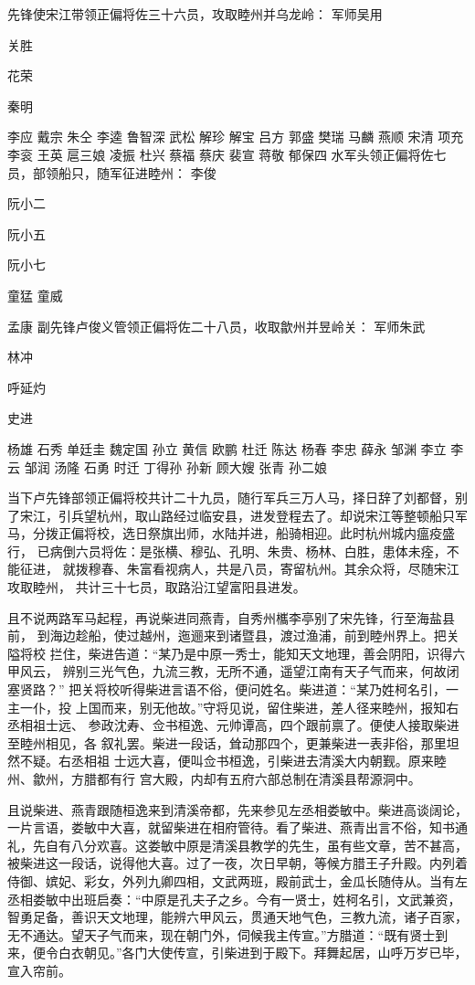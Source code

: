 先锋使宋江带领正偏将佐三十六员，攻取睦州并乌龙岭：
军师吴用

关胜

花荣

秦明

李应
戴宗
朱仝
李逵
鲁智深
武松
解珍
解宝
吕方
郭盛
樊瑞
马麟
燕顺
宋清
项充
李衮
王英
扈三娘
凌振
杜兴
蔡福
蔡庆
裴宣
蒋敬
郁保四
水军头领正偏将佐七员，部领船只，随军征进睦州：
李俊

阮小二

阮小五

阮小七

童猛
童威

孟康
副先锋卢俊义管领正偏将佐二十八员，收取歙州并昱岭关：
军师朱武

林冲

呼延灼

史进

杨雄
石秀
单廷圭
魏定国
孙立
黄信
欧鹏
杜迁
陈达
杨春
李忠
薛永
邹渊
李立
李云
邹润
汤隆
石勇
时迁
丁得孙
孙新
顾大嫂
张青
孙二娘

当下卢先锋部领正偏将校共计二十九员，随行军兵三万人马，择日辞了刘都督，别
了宋江，引兵望杭州，取山路经过临安县，进发登程去了。却说宋江等整顿船只军
马，分拨正偏将校，选日祭旗出师，水陆并进，船骑相迎。此时杭州城内瘟疫盛行，
已病倒六员将佐：是张横、穆弘、孔明、朱贵、杨林、白胜，患体未痊，不能征进，
就拨穆春、朱富看视病人，共是八员，寄留杭州。其余众将，尽随宋江攻取睦州，
共计三十七员，取路沿江望富阳县进发。

且不说两路军马起程，再说柴进同燕青，自秀州欈李亭别了宋先锋，行至海盐县前，
到海边趁船，使过越州，迤逦来到诸暨县，渡过渔浦，前到睦州界上。把关隘将校
拦住，柴进告道：“某乃是中原一秀士，能知天文地理，善会阴阳，识得六甲风云，
辨别三光气色，九流三教，无所不通，遥望江南有天子气而来，何故闭塞贤路？”
把关将校听得柴进言语不俗，便问姓名。柴进道：“某乃姓柯名引，一主一仆，投
上国而来，别无他故。”守将见说，留住柴进，差人径来睦州，报知右丞相祖士远、
参政沈寿、佥书桓逸、元帅谭高，四个跟前禀了。便使人接取柴进至睦州相见，各
叙礼罢。柴进一段话，耸动那四个，更兼柴进一表非俗，那里坦然不疑。右丞相祖
士远大喜，便叫佥书桓逸，引柴进去清溪大内朝觐。原来睦州、歙州，方腊都有行
宫大殿，内却有五府六部总制在清溪县帮源洞中。

且说柴进、燕青跟随桓逸来到清溪帝都，先来参见左丞相娄敏中。柴进高谈阔论，
一片言语，娄敏中大喜，就留柴进在相府管待。看了柴进、燕青出言不俗，知书通
礼，先自有八分欢喜。这娄敏中原是清溪县教学的先生，虽有些文章，苦不甚高，
被柴进这一段话，说得他大喜。过了一夜，次日早朝，等候方腊王子升殿。内列着
侍御、嫔妃、彩女，外列九卿四相，文武两班，殿前武士，金瓜长随侍从。当有左
丞相娄敏中出班启奏：“中原是孔夫子之乡。今有一贤士，姓柯名引，文武兼资，
智勇足备，善识天文地理，能辨六甲风云，贯通天地气色，三教九流，诸子百家，
无不通达。望天子气而来，现在朝门外，伺候我主传宣。”方腊道：“既有贤士到
来，便令白衣朝见。”各门大使传宣，引柴进到于殿下。拜舞起居，山呼万岁已毕，
宣入帘前。


